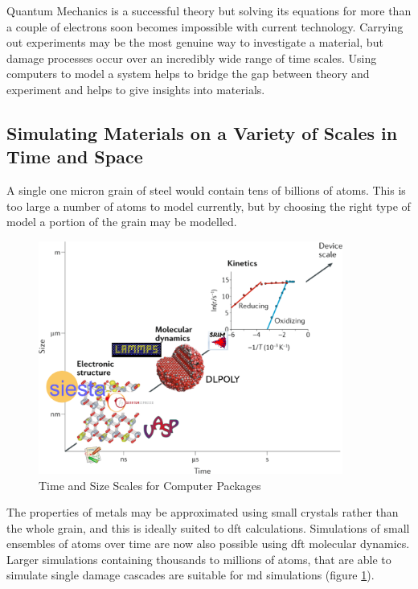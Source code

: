 Quantum Mechanics is a successful theory but solving its equations for more than a couple of electrons soon becomes impossible with current technology.  Carrying out experiments may be the most genuine way to investigate a material, but damage processes occur over an incredibly wide range of time scales.  Using computers to model a system helps to bridge the gap between theory and experiment and helps to give insights into materials.

\FloatBarrier
\subsection{Simulating Materials on a Variety of Scales in Time and Space}

A single one micron grain of steel would contain tens of billions of atoms.  This is too large a number of atoms to model currently, but by choosing the right type of model a portion of the grain may be modelled.


\begin{figure}[htbp]
  \begin{center}
    \includegraphics[width=10.0cm]{chapters/interatomic_potential_fitting/images/scale.png}
    \caption{Time and Size Scales for Computer Packages \cite{scalediagram}}
    \label{fig:timesizascalesmodelling}
  \end{center}
\end{figure}

The properties of metals may be approximated using small crystals rather than the whole grain, and this is ideally suited to \acrshort{dft} calculations.  Simulations of small ensembles of atoms over time are now also possible using \acrshort{dft} molecular dynamics.  Larger simulations containing thousands to millions of atoms, that are able to simulate single damage cascades are suitable for \acrshort{md} simulations (figure \ref{fig:timesizascalesmodelling}). 




